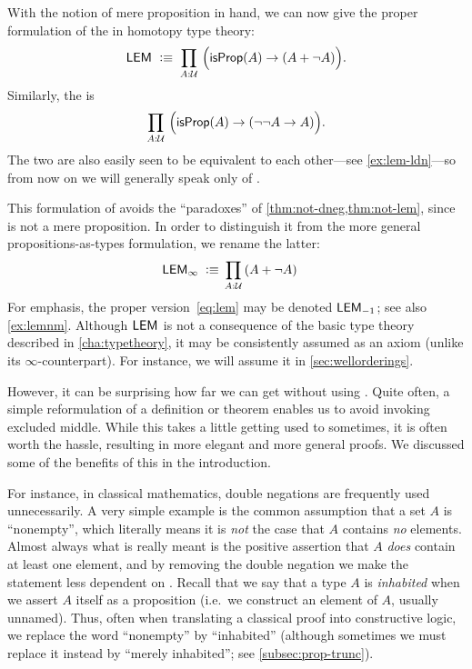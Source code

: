 %
%
With the notion of mere proposition in hand, we can now give the proper formulation of the 
%
%
%
in homotopy type theory:
\begin{equation}
  \label{eq:lem}
  \LEM{}\;\defeq\;
  \prd{A:\UU} \Big(\isprop(A) \to (A + \neg A)\Big).
\end{equation}
Similarly, the 
%
%
%
is
\begin{equation}
  \label{eq:ldn}
  \prd{A:\UU} \Big(\isprop(A) \to (\neg\neg A \to A)\Big).
\end{equation}
The two are also easily seen to be equivalent to each other---see \autoref{ex:lem-ldn}---so from now on we will generally speak only of \LEM{}.

This formulation of \LEM{} avoids the ``paradoxes'' of \autoref{thm:not-dneg,thm:not-lem}, since \bool is not a mere proposition.
In order to distinguish it from the more general propositions-as-types formulation, we rename the latter:
\begin{align*}
  \LEM\infty\;\defeq\;&
  \prd{A:\UU} (A + \neg A)
\end{align*}
For emphasis, the proper version~\eqref{eq:lem}
may be denoted $\mathsf{LEM}_{-1}$;
see also \autoref{ex:lemnm}.
Although $\mathsf{LEM}_{}$
is not a consequence of the basic type theory described in \autoref{cha:typetheory}, it may be consistently assumed as an axiom (unlike its $\infty$-counterpart).
For instance, we will assume it in \autoref{sec:wellorderings}.

However, it can be surprising how far we can get without using \LEM{}.
Quite often, a simple reformulation of a definition or theorem enables us to avoid invoking excluded middle.
While this takes a little getting used to sometimes, it is often worth the hassle, resulting in more elegant and more general proofs.
We discussed some of the benefits of this in the introduction.

For instance, in classical mathematics, double negations are frequently used unnecessarily.
A very simple example is the common assumption that a set $A$ is ``nonempty'', which literally means it is \emph{not} the case that $A$ contains \emph{no} elements.
Almost always what is really meant is the positive assertion that $A$ \emph{does} contain at least one element, and by removing the double negation we make the statement less dependent on \LEM{}.
Recall that we say that a type $A$ is \emph{inhabited}
%
when we assert $A$ itself as a proposition (i.e.\ we construct an element of $A$, usually unnamed).
Thus, often when translating a classical proof into constructive logic, we replace the word ``nonempty'' by ``inhabited'' (although sometimes we must replace it instead by ``merely inhabited''; see \autoref{subsec:prop-trunc}).

